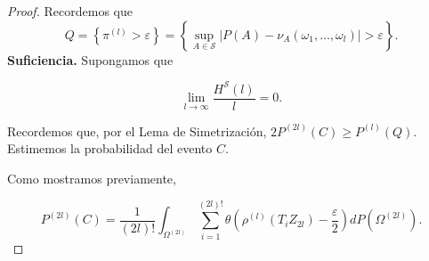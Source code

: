 \documentclass{report}
\begin{document}
\begin{proof} 
    
    Recordemos que 
\[
Q = \left\{ \pi^{(l)} > \varepsilon \right\} = \left\{ \sup_{A\in\mathcal{S}} |P(A)-\nu_A\left(\omega_1,\ldots, \omega_l\right)| > \varepsilon\right\}.
\]
\newline
\textbf{Suficiencia.}
Supongamos que

\[
\lim_{l \to \infty} \frac{H^{\mathcal{S}}(l)}{l} = 0.
\]

Recordemos que, por el Lema de Simetrización, \( 2P^{(2l)}(C) \geq P^{(l)}(Q) \). Estimemos la probabilidad del evento \( C \).\newline

Como mostramos previamente,

\[
P^{(2l)}(C) = \frac{1}{(2l)!} \int_{\Omega^{(2l)}} \sum_{i=1}^{(2l)!} \theta \left( \rho^{(l)}(T_i Z_{2l}) - \frac{\varepsilon}{2} \right) dP(\Omega^{(2l)}).
\]


\end{proof}
\end{document}
